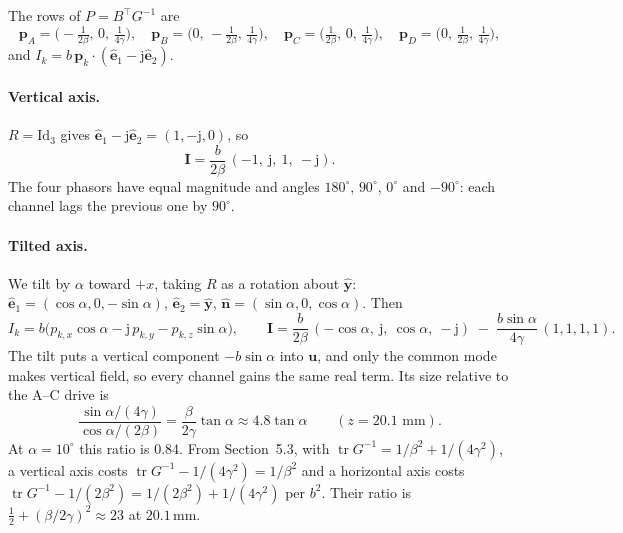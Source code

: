 \documentclass[11pt]{article}
\newcommand{\vb}[1]{\mathbf{#1}}
\newcommand{\uv}[1]{\hat{\mathbf{#1}}}
\newcommand{\jj}{\mathrm{j}}
\newcommand{\Id}{\mathrm{Id}}
\begin{document}
The rows of $P = B^\top G^{-1}$ are
\begin{equation}
  \vb p_A = \Big(-\tfrac{1}{2\beta},\,0,\,\tfrac{1}{4\gamma}\Big),\quad
  \vb p_B = \Big(0,\,-\tfrac{1}{2\beta},\,\tfrac{1}{4\gamma}\Big),\quad
  \vb p_C = \Big(\tfrac{1}{2\beta},\,0,\,\tfrac{1}{4\gamma}\Big),\quad
  \vb p_D = \Big(0,\,\tfrac{1}{2\beta},\,\tfrac{1}{4\gamma}\Big),
\end{equation}
and $I_k = b\,\vb p_k\cdot(\uv e_1 - \jj\uv e_2)$.

\paragraph{Vertical axis.} $R = \Id_3$ gives $\uv e_1 - \jj\uv e_2 = (1,-\jj,0)$, so
\begin{equation}
  \vb I = \frac{b}{2\beta}\,(-1,\ \jj,\ 1,\ -\jj).
\end{equation}
The four phasors have equal magnitude and angles $180^\circ$, $90^\circ$, $0^\circ$ and $-90^\circ$:
each channel lags the previous one by $90^\circ$.

\paragraph{Tilted axis.} We tilt by $\alpha$ toward $+x$, taking $R$ as a rotation about $\uv y$:
$\uv e_1 = (\cos\alpha,0,-\sin\alpha)$, $\uv e_2 = \uv y$, $\uv n = (\sin\alpha,0,\cos\alpha)$. Then
\begin{equation}
  I_k = b\big(p_{k,x}\cos\alpha - \jj\,p_{k,y} - p_{k,z}\sin\alpha\big),
  \qquad
  \vb I = \frac{b}{2\beta}\,(-\cos\alpha,\ \jj,\ \cos\alpha,\ -\jj)
  \;-\;\frac{b\sin\alpha}{4\gamma}\,(1,1,1,1).
\end{equation}
The tilt puts a vertical component $-b\sin\alpha$ into $\vb u$, and only the common mode makes
vertical field, so every channel gains the same real term. Its size relative to the A--C drive is
\begin{equation}
  \frac{\sin\alpha/(4\gamma)}{\cos\alpha/(2\beta)} = \frac{\beta}{2\gamma}\tan\alpha
  \approx 4.8\tan\alpha\qquad(z=20.1\text{ mm}).
\end{equation}
At $\alpha = 10^\circ$ this ratio is $0.84$. From Section~5.3, with
$\operatorname{tr}G^{-1} = 1/\beta^2 + 1/(4\gamma^2)$, a vertical axis costs
$\operatorname{tr}G^{-1} - 1/(4\gamma^2) = 1/\beta^2$ and a horizontal axis costs
$\operatorname{tr}G^{-1} - 1/(2\beta^2) = 1/(2\beta^2) + 1/(4\gamma^2)$ per $b^2$. Their ratio is
$\tfrac12 + (\beta/2\gamma)^2 \approx 23$ at $20.1$\,mm.
\end{document}
